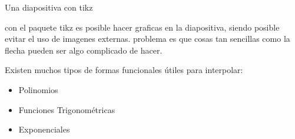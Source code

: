 \begin{frame}{Una diapositiva con tikz}
\centering
\vspace{1cm}
  \note con el paquete tikz es posible hacer graficas en la diapositiva, siendo posible evitar el uso de 
  imagenes externas. 
  \note problema es que cosas tan sencillas como la flecha pueden ser algo complicado de hacer. 

Existen muchos tipos de formas funcionales útiles para interpolar:
\begin{center}
\begin{itemize}
\item Polinomios
\item Funciones Trigonométricas
\item Exponenciales
\end{itemize}
\end{center}
\end{frame}
